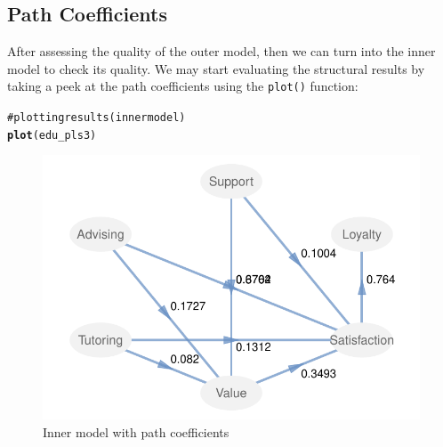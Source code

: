 \documentclass[12pt]{book}\usepackage{graphicx, color}
\makeatletter
\newcommand{\hlfunctioncall}[1]{\textcolor[rgb]{0.501960784313725,0,0.329411764705882}{\textbf{#1}}}%
\newcommand{\hlcomment}[1]{\textcolor[rgb]{0.180392156862745,0.6,0.341176470588235}{#1}}%
\newenvironment{kframe}{%
 \def\at@end@of@kframe{}%
 \ifinner\ifhmode%
  \def\at@end@of@kframe{\end{minipage}}%
  \begin{minipage}{\columnwidth}%
 \fi\fi%
 \def\FrameCommand##1{\hskip\@totalleftmargin \hskip-\fboxsep
 \colorbox{shadecolor}{##1}\hskip-\fboxsep
     \hskip-\linewidth \hskip-\@totalleftmargin \hskip\columnwidth}%
 \MakeFramed {\advance\hsize-\width
   \@totalleftmargin\z@ \linewidth\hsize
   \@setminipage}}%
 {\par\unskip\endMakeFramed%
 \at@end@of@kframe}
\newenvironment{knitrout}{}{} %
\newcommand{\code}[1]{\texttt{#1}}
\makeatother
\begin{document}
\subsection{Path Coefficients}
After assessing the quality of the outer model, then we can turn into the inner model to check its quality. We may start evaluating the structural results by taking a peek at the path coefficients using the \code{plot()} function:
\begin{knitrout}
\color{fgcolor}\begin{kframe}
\begin{alltt}
\hlcomment{# plotting results (inner model)}
\hlfunctioncall{plot}(edu_pls3)
\end{alltt}
\end{kframe}\begin{figure}[h]


{\centering \includegraphics[width=.8\linewidth,height=.5\linewidth]{figure/edu_pls3_plot_inner1} 

}

\caption[Inner model with path coefficients]{Inner model with path coefficients\label{fig:edu_pls3_plot_inner1}}
\end{figure}


\end{knitrout}
\end{document}
